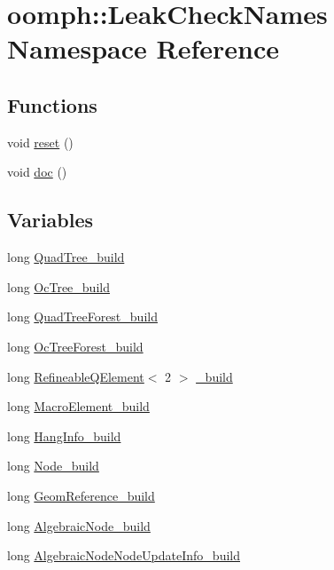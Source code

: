 \hypertarget{namespaceoomph_1_1LeakCheckNames}{}\section{oomph\+:\+:Leak\+Check\+Names Namespace Reference}
\label{namespaceoomph_1_1LeakCheckNames}
\subsection*{Functions}
\begin{DoxyCompactItemize}
\item 
void \hyperlink{namespaceoomph_1_1LeakCheckNames_a0ce3a9e079632ff8ff7e5d9c4258c620}{reset} ()
\item 
void \hyperlink{namespaceoomph_1_1LeakCheckNames_ad5ef7bca3a63e643b0eec22dd3bab58b}{doc} ()
\end{DoxyCompactItemize}
\subsection*{Variables}
\begin{DoxyCompactItemize}
\item 
long \hyperlink{namespaceoomph_1_1LeakCheckNames_a351966bc1ea214b5cabfa8a2ddbc11a1}{Quad\+Tree\+\_\+build}
\item 
long \hyperlink{namespaceoomph_1_1LeakCheckNames_ae550f6949511aa03ea98188eca2ad49e}{Oc\+Tree\+\_\+build}
\item 
long \hyperlink{namespaceoomph_1_1LeakCheckNames_a010e35c7b7095d47bfcf7a2f84f0ee47}{Quad\+Tree\+Forest\+\_\+build}
\item 
long \hyperlink{namespaceoomph_1_1LeakCheckNames_a8f27a2ceb410044d17f59cdcd362358d}{Oc\+Tree\+Forest\+\_\+build}
\item 
long \hyperlink{classoomph_1_1RefineableQElement}{Refineable\+Q\+Element}$<$ 2 $>$ \hyperlink{namespaceoomph_1_1LeakCheckNames_a6073b8e2ad2b94519b899f11682b3e07}{\+\_\+build}
\item 
long \hyperlink{namespaceoomph_1_1LeakCheckNames_a476fe9e4ac0c35fd2728482b057eac1d}{Macro\+Element\+\_\+build}
\item 
long \hyperlink{namespaceoomph_1_1LeakCheckNames_a64e19877adeefc340e80e123fda601c0}{Hang\+Info\+\_\+build}
\item 
long \hyperlink{namespaceoomph_1_1LeakCheckNames_a19c2258aca1f7ebedf466b03ac245183}{Node\+\_\+build}
\item 
long \hyperlink{namespaceoomph_1_1LeakCheckNames_abce23df3d85b2382c3a4c96aca9105bb}{Geom\+Reference\+\_\+build}
\item 
long \hyperlink{namespaceoomph_1_1LeakCheckNames_a2f5d29c2e057271177919c9bf0d68eb1}{Algebraic\+Node\+\_\+build}
\item 
long \hyperlink{namespaceoomph_1_1LeakCheckNames_a321ef3e96c25ca67e8d2fd473f24b544}{Algebraic\+Node\+Node\+Update\+Info\+\_\+build}
\end{DoxyCompactItemize}



